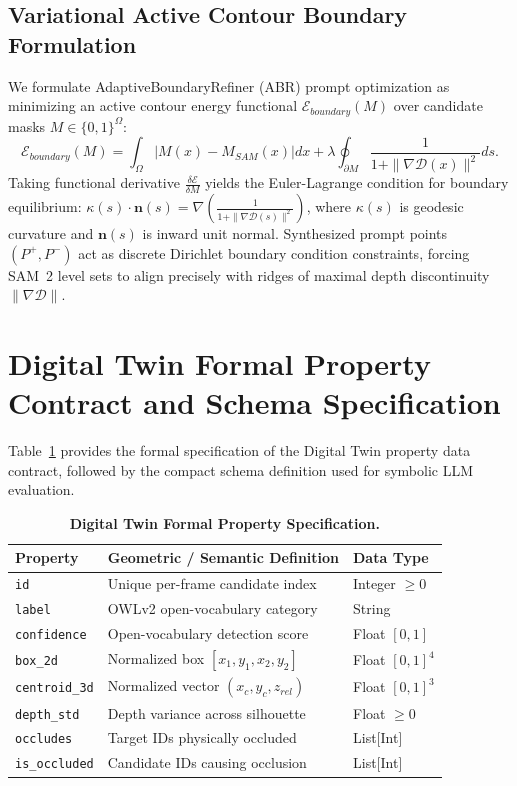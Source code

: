 \documentclass[10pt,twocolumn,letterpaper]{article}
\begin{document}
\subsection{Variational Active Contour Boundary Formulation}
We formulate AdaptiveBoundaryRefiner (ABR) prompt optimization as minimizing an active contour energy functional $\mathcal{E}_{boundary}(M)$ over candidate masks $M \in \{0, 1\}^{\Omega}$:
\begin{equation}
\mathcal{E}_{boundary}(M) = \int_{\Omega} |M(x) - M_{SAM}(x)| dx + \lambda \oint_{\partial M} \frac{1}{1 + \|\nabla \mathcal{D}(x)\|^2} ds.
\end{equation}
Taking functional derivative $\frac{\delta \mathcal{E}}{\delta M}$ yields the Euler-Lagrange condition for boundary equilibrium: $\kappa(s) \cdot \mathbf{n}(s) = \nabla ( \frac{1}{1 + \|\nabla \mathcal{D}(s)\|^2} )$, where $\kappa(s)$ is geodesic curvature and $\mathbf{n}(s)$ is inward unit normal. Synthesized prompt points $(P^+, P^-)$ act as discrete Dirichlet boundary condition constraints, forcing SAM~2 level sets to align precisely with ridges of maximal depth discontinuity $\|\nabla \mathcal{D}\|$.

\section{Digital Twin Formal Property Contract and Schema Specification}
\label{app:schema}

Table~\ref{tab:schema_def} provides the formal specification of the Digital Twin property data contract, followed by the compact schema definition used for symbolic LLM evaluation.

\begin{table}[ht]
\centering
\scriptsize
\renewcommand{\arraystretch}{0.9}
\caption{\textbf{Digital Twin Formal Property Specification.}}
\label{tab:schema_def}
\begin{tabularx}{\columnwidth}{lXl}
\toprule
\textbf{Property} & \textbf{Geometric / Semantic Definition} & \textbf{Data Type} \\
\midrule
\texttt{id} & Unique per-frame candidate index & Integer $\ge 0$ \\
\texttt{label} & OWLv2 open-vocabulary category & String \\
\texttt{confidence} & Open-vocabulary detection score & Float $[0, 1]$ \\
\texttt{box\_2d} & Normalized box $[x_1, y_1, x_2, y_2]$ & Float $[0, 1]^4$ \\
\texttt{centroid\_3d} & Normalized vector $(x_c, y_c, z_{rel})$ & Float $[0, 1]^3$ \\
\texttt{depth\_std} & Depth variance across silhouette & Float $\ge 0$ \\
\texttt{occludes} & Target IDs physically occluded & List[Int] \\
\texttt{is\_occluded} & Candidate IDs causing occlusion & List[Int] \\
\bottomrule
\end{tabularx}
\end{table}
\end{document}
